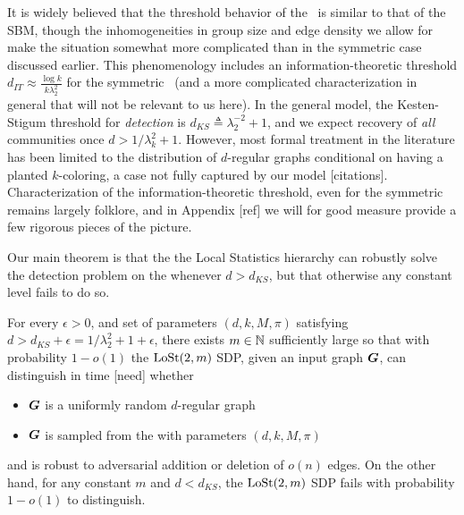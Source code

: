 It is widely believed that the threshold behavior of the \model~is similar to that of the SBM, though the inhomogeneities in group size and edge density we allow for make the situation somewhat more complicated than in the symmetric case discussed earlier. This phenomenology includes an information-theoretic threshold $d_{IT} \approx \frac{\log k}{k\lambda_2^2}$ for the symmetric \model~(and a more complicated characterization in general that will not be relevant to us here). In the general model, the Kesten-Stigum threshold for \emph{detection} is $d_{KS} \triangleq \lambda_2^{-2} + 1$, and we expect recovery of \emph{all} communities once $d> 1/\lambda_k^2 + 1$. However, most formal treatment in the literature has been limited to the distribution of $d$-regular graphs conditional on having a planted $k$-coloring, a case not fully captured by our model [citations]. Characterization of the information-theoretic threshold, even for the symmetric \model remains largely folklore, and in Appendix [ref] we will for good measure provide a few rigorous pieces of the picture. 

Our main theorem is that the the Local Statistics hierarchy can robustly solve the detection problem on the \model whenever $d > d_{KS}$, but that otherwise any constant level fails to do so.

\begin{theorem} \label{thm:main}
	For every $\epsilon > 0$, and set of parameters $(d,k,M,\pi)$ satisfying $d > d_{KS} + \epsilon = 1/\lambda_2^2 + 1 + \epsilon$, there exists $m \in \mathbb{N}$ sufficiently large so that with probability $1-o(1)$ the $\operatorname{LoSt}(2,m)$ SDP, given an input graph $\boldsymbol{G}$, can distinguish in time [need] whether
	\begin{itemize}
		\item $\boldsymbol{G}$ is a uniformly random $d$-regular graph
		\item $\boldsymbol{G}$ is sampled from the \model with parameters $(d,k,M,\pi)$
	\end{itemize}
	and is robust to adversarial addition or deletion of $o(n)$ edges. On the other hand, for any constant $m$ and $d< d_{KS}$, the $\operatorname{LoSt}(2,m)$ SDP fails with probability $1 - o(1)$ to distinguish.
\end{theorem}




